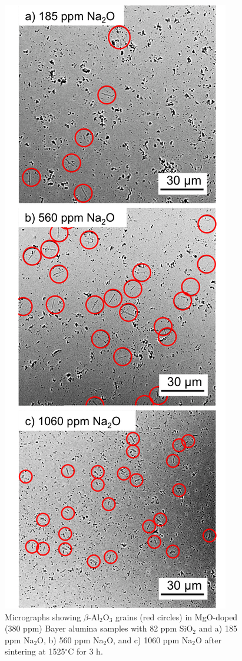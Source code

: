 \newpage
\begin{figure}[H]
	\centering
	\includegraphics{Chapter-5/Figures/Figure6.png}
	\caption{Micrographs showing $\beta$-Al$_{2}$O$_{3}$ grains (red circles) in MgO-doped (380 ppm) Bayer alumina samples with 82 ppm SiO$_{2}$ and a) 185 ppm Na$_{2}$O, b) 560 ppm Na$_{2}$O, and c) 1060 ppm Na$_{2}$O after sintering at 1525$^{\circ}$C for 3 h.}
	\label{Ch5-figure:Figure6}
\end{figure}

